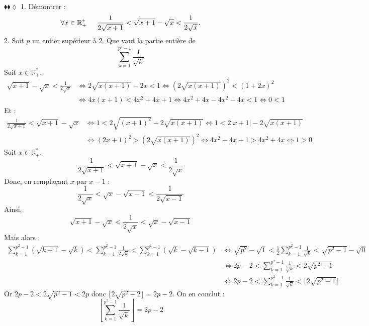 \documentclass[11pt]{article}
\begin{document}
\begin{exercice}{$\blacklozenge\blacklozenge\lozenge$}{}
    1. Démontrer : 
    \begin{equation*}
        \forall{x\in\mathbb{R}^*_+}\hspace{0.5cm}\frac{1}{2\sqrt{x+1}}<\sqrt{x+1}-\sqrt{x}<\frac{1}{2\sqrt{x}}.
    \end{equation*}
    2. Soit $p$ un entier supérieur à $2$. Que vaut la partie entière de
    \begin{equation*}
        \sum_{k=1}^{p^2-1}{\frac{1}{\sqrt{k}}}
    \end{equation*}
    \tcblower
     Soit $x\in\mathbb{R}^*_+$.
    \begin{align*}
        \sqrt{x+1}-\sqrt{x}<\frac{1}{2\sqrt{x}}
        &\iff 2\sqrt{x(x+1)}-2x<1
        \iff (2\sqrt{x(x+1)})^2<(1+2x)^2\\
        &\iff 4x(x+1)<4x^2+4x+1
        \iff 4x^2+4x-4x^2-4x<1
        \iff 0<1
    \end{align*}
    Et :
    \begin{align*}
        \frac{1}{2\sqrt{x+1}}<\sqrt{x+1}-\sqrt{x}
        &\iff 1<2\sqrt{(x+1)^2}-2\sqrt{x(x+1)}
        \iff 1<2|x+1|-2\sqrt{x(x+1)}\\
        &\iff (2x+1)^2>(2\sqrt{x(x+1)})^2
        \iff 4x^2+4x+1>4x^2+4x
        \iff 1>0
    \end{align*}
    Soit $x\in\mathbb{R}^*_+$.
    \begin{equation*}
        \frac{1}{2\sqrt{x+1}}<\sqrt{x+1}-\sqrt{x}<\frac{1}{2\sqrt{x}}
    \end{equation*}
    Donc, en remplaçant $x$ par $x-1$ :
    \begin{equation*}
        \frac{1}{2\sqrt{x}}<\sqrt{x}-\sqrt{x-1}<\frac{1}{2\sqrt{x-1}}
    \end{equation*}
    Ainsi,
    \begin{equation*}
        \sqrt{x+1}-\sqrt{x}<\frac{1}{2\sqrt{x}}<\sqrt{x}-\sqrt{x-1}
    \end{equation*}
    Mais alors :
    \begin{align*}
        \sum^{p^2-1}_{k=1}{\left(\sqrt{k+1}-\sqrt{k}\right)}<\sum^{p^2-1}_{k=1}{\frac{1}{2\sqrt{k}}}<\sum^{p^2-1}_{k=1}{\left(\sqrt{k}-\sqrt{k-1}\right)} &\iff\sqrt{p^2}-\sqrt{1}<\frac{1}{2}\sum^{p^2-1}_{k=1}{\frac{1}{\sqrt{k}}}<\sqrt{p^2-1}-\sqrt{0}\\
        &\iff2p-2<\sum^{p^2-1}_{k=1}{\frac{1}{\sqrt{k}}}<2\sqrt{p^2-1}\\
        &\iff2p-2<\sum^{p^2-1}_{k=1}{\frac{1}{\sqrt{k}}}<\lfloor{2\sqrt{p^2-1}}\rfloor
    \end{align*}
    Or $2p-2<2\sqrt{p^2-1}<2p$ donc $\lfloor{2\sqrt{p^2-2}}\rfloor=2p-2$. On en conclut : 
    \begin{equation*}
        \left\lfloor{\sum^{p^2-1}_{k=1}{\frac{1}{\sqrt{k}}}}\right\rfloor = 2p-2
    \end{equation*}
\end{exercice}
\end{document}
